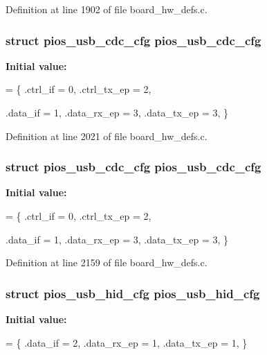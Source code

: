 Definition at line 1902 of file board\-\_\-hw\-\_\-defs.\-c.

\hypertarget{group___tau_labs_core_ga05cc3e449d417c7f9097d2659e6f5ca3}{
\subsubsection[{pios\-\_\-usb\-\_\-cdc\-\_\-cfg}]{\setlength{\rightskip}{0pt plus 5cm}struct {\bf pios\-\_\-usb\-\_\-cdc\-\_\-cfg} {\bf pios\-\_\-usb\-\_\-cdc\-\_\-cfg}}}\label{group___tau_labs_core_ga05cc3e449d417c7f9097d2659e6f5ca3}
{\bfseries Initial value\-:}
\begin{DoxyCode}
= \{
        .ctrl\_if = 0,
        .ctrl\_tx\_ep = 2,

        .data\_if = 1,
        .data\_rx\_ep = 3,
        .data\_tx\_ep = 3,
\}
\end{DoxyCode}


Definition at line 2021 of file board\-\_\-hw\-\_\-defs.\-c.

\hypertarget{group___tau_labs_core_ga05cc3e449d417c7f9097d2659e6f5ca3}{
\subsubsection[{pios\-\_\-usb\-\_\-cdc\-\_\-cfg}]{\setlength{\rightskip}{0pt plus 5cm}struct {\bf pios\-\_\-usb\-\_\-cdc\-\_\-cfg} {\bf pios\-\_\-usb\-\_\-cdc\-\_\-cfg}}}\label{group___tau_labs_core_ga05cc3e449d417c7f9097d2659e6f5ca3}
{\bfseries Initial value\-:}
\begin{DoxyCode}
= \{
        .ctrl\_if = 0,
        .ctrl\_tx\_ep = 2,

        .data\_if = 1,
        .data\_rx\_ep = 3,
        .data\_tx\_ep = 3,
\}
\end{DoxyCode}


Definition at line 2159 of file board\-\_\-hw\-\_\-defs.\-c.

\hypertarget{group___tau_labs_core_ga3665f6d3a2cccc431b55b9432291e94c}{
\subsubsection[{pios\-\_\-usb\-\_\-hid\-\_\-cfg}]{\setlength{\rightskip}{0pt plus 5cm}struct {\bf pios\-\_\-usb\-\_\-hid\-\_\-cfg} {\bf pios\-\_\-usb\-\_\-hid\-\_\-cfg}}}\label{group___tau_labs_core_ga3665f6d3a2cccc431b55b9432291e94c}
{\bfseries Initial value\-:}
\begin{DoxyCode}
= \{
        .data\_if = 2,
        .data\_rx\_ep = 1,
        .data\_tx\_ep = 1,
\}
\end{DoxyCode}


